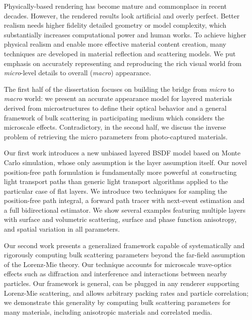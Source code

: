 \thesisabstract
{
  Physically-based rendering has become mature and commonplace in recent decades. However, the rendered results look artificial and overly perfect. Better realism needs higher fidelity detailed geometry or model complexity, which substantially increases computational power and human works. To achieve higher physical realism and enable more effective material content creation, many techniques are developed in material reflection and scattering models. We put emphasis on accurately representing and reproducing the rich visual world from \emph{micro}-level details to overall (\emph{macro}) appearance.

  The first half of the dissertation focuses on building the bridge from \emph{micro} to \emph{macro} world: we present an accurate appearance model for layered materials derived from microstructures to define their optical behavior and a general framework of bulk scattering in participating medium which considers the microscale effects. Contradictory, in the second half, we discuss the inverse problem of retrieving the micro parameters from photo-captured materials. 

  Our first work introduces a new unbiased layered BSDF model based on Monte Carlo simulation, whose only assumption is the layer assumption itself. Our novel position-free path formulation is fundamentally more powerful at constructing light transport paths than generic light transport algorithms applied to the particular case of flat layers. We introduce two techniques for sampling the position-free path integral, a forward path tracer with next-event estimation and a full bidirectional estimator. We show several examples featuring multiple layers with surface and volumetric scattering, surface and phase function anisotropy, and spatial variation in all parameters.

  Our second work presents a generalized framework capable of systematically and rigorously computing bulk scattering parameters beyond the far-field assumption of the Lorenz-Mie theory. Our technique accounts for microscale wave-optics effects such as diffraction and interference and interactions between nearby particles. Our framework is general, can be plugged in any renderer supporting Lorenz-Mie scattering, and allows arbitrary packing rates and particle correlation; we demonstrate this generality by computing bulk scattering parameters for many materials, including anisotropic materials and correlated media.

}
